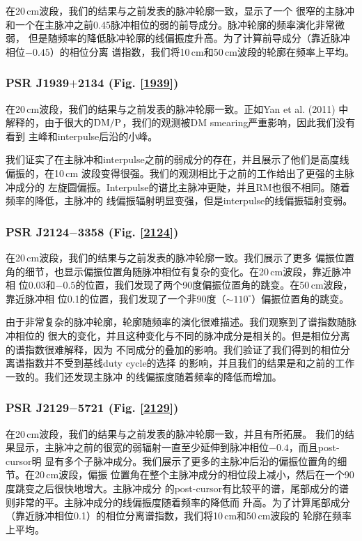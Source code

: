 在20\,cm波段，我们的结果与之前发表的脉冲轮廓一致\supercite{Ord04,Yan11a}，显示了一个
很窄的主脉冲和一个在主脉冲之前0.45脉冲相位的弱的前导成分。脉冲轮廓的频率演化非常微弱，
但是随频率的降低脉冲轮廓的线偏振度升高。为了计算前导成分（靠近脉冲相位$-0.45$）的相位分离
谱指数，我们将10\,cm和50\,cm波段的轮廓在频率上平均。

\subsubsection{PSR J1939$+$2134 (Fig. \ref{1939})}

在20\,cm波段，我们的结果与之前发表的脉冲轮廓一致\supercite{Yan11a}。正如Yan et al. (2011)
中解释的，由于很大的$\rm{DM}/P$，我们的观测被DM smearing严重影响，因此我们没有看到
主峰和interpulse后沿的小峰\supercite{Thorsett90,Stairs99,Ord04}。

我们证实了在主脉冲和interpulse之前的弱成分的存在，并且展示了他们是高度线偏振的，在10\,cm
波段变得很强。我们的观测相比于之前的工作\supercite{Yan11a}给出了更强的主脉冲成分的
左旋圆偏振。Interpulse的谱比主脉冲更陡，并且RM也很不相同。随着频率的降低，主脉冲的
线偏振辐射明显变强，但是interpulse的线偏振辐射变弱。


\subsubsection{PSR J2124$-$3358 (Fig. \ref{2124})}

在20\,cm波段，我们的结果与之前发表的脉冲轮廓一致\supercite{Yan11a}。我们展示了更多
偏振位置角的细节，也显示偏振位置角随脉冲相位有复杂的变化。在20\,cm波段，靠近脉冲相
位0.03和$-0.5$的位置，我们发现了两个90度偏振位置角的跳变。在50\,cm波段，靠近脉冲相
位0.1的位置，我们发现了一个非90度（$\sim110^{\circ}$）偏振位置角的跳变。

由于非常复杂的脉冲轮廓，轮廓随频率的演化很难描述。我们观察到了谱指数随脉冲相位的
很大的变化，并且这种变化与不同的脉冲成分是相关的。但是相位分离的谱指数很难解释，因为
不同成分的叠加的影响。我们验证了我们得到的相位分离谱指数并不受到基线duty cycle的选择
的影响，并且我们的结果是和之前的工作一致的\supercite{Manchester04}。我们还发现主脉冲
的线偏振度随着频率的降低而增加。

\subsubsection{PSR J2129$-$5721 (Fig. \ref{2129})}

在20\,cm波段，我们的结果与之前发表的脉冲轮廓一致，并且有所拓展\supercite{Yan11a}。
我们的结果显示，主脉冲之前的很宽的弱辐射一直至少延伸到脉冲相位$-0.4$，而且post-cursor明
显有多个子脉冲成分。我们展示了更多的主脉冲后沿的偏振位置角的细节。在20\,cm波段，偏振
位置角在整个主脉冲成分的相位段上减小，然后在一个90度跳变之后很快地增大。主脉冲成分
的post-cursor有比较平的谱，尾部成分的谱则非常的平。主脉冲成分的线偏振度随着频率的降低而
升高。为了计算尾部成分（靠近脉冲相位0.1）的相位分离谱指数，我们将10\,cm和50\,cm波段的
轮廓在频率上平均。

